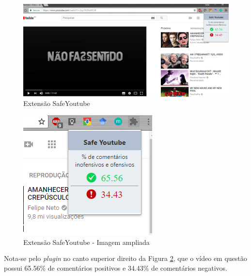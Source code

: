 \begin{figure}[H] %
	\caption{\label{fig:chrome_plugin} Extensão SafeYoutube}
	\begin{center}
	    \includegraphics[scale=0.4]{figuras/extensao_chrome_normal.png} %
	\end{center}
\end{figure}

\begin{figure}[H] %
	\caption{\label{fig:chrome_plugin_zoom} Extensão SafeYoutube - Imagem ampliada}
	\begin{center}
	    \includegraphics[scale=0.7]{figuras/extensao_chrome_zoom.png} %
	\end{center}
\end{figure}

Nota-se pelo \textit{plugin} no canto superior direito da Figura \ref{fig:chrome_plugin_zoom}, que o vídeo em questão possui 65.56\% de comentários positivos e 34.43\% de comentários negativos.

